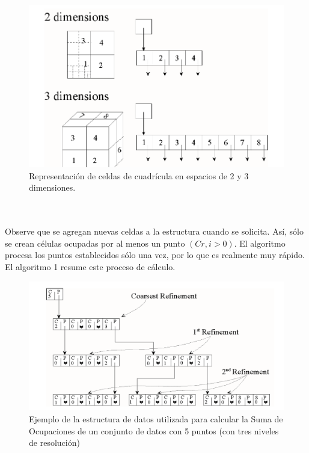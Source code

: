 \begin{figure}[h]
\centering
\includegraphics[scale=1.0]{chapter4/ima5.png}
\caption{ Representación de celdas de cuadrícula en espacios de 2 y 3 dimensiones. }
\label{fig:ima5}
\end{figure}
\\\\

Observe que se agregan nuevas celdas a la estructura cuando se solicita. Así, sólo se crean células ocupadas por al menos un punto $(C r, i> 0)$. El algoritmo procesa los puntos establecidos sólo una vez, por lo que es realmente muy rápido. El algoritmo 1 resume este proceso de cálculo.\\


\begin{figure}[h]
\centering
\includegraphics[scale=1.2]{chapter4/ima6.png}
\caption{Ejemplo de la estructura de datos utilizada para calcular la Suma de Ocupaciones de un conjunto de datos con 5 puntos (con tres niveles de resolución) }
\label{fig:ima6}
\end{figure}
 

